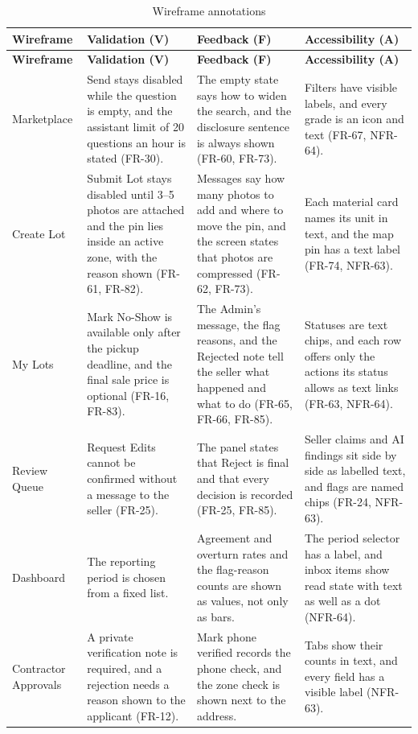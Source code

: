 {\footnotesize
\begin{longtable}{@{}p{}p{}p{}p{}@{}}
\caption{Wireframe annotations}\label{tab:wireframe-annotations}\\
\toprule
\textbf{Wireframe} & \textbf{Validation (V)} & \textbf{Feedback (F)} & \textbf{Accessibility (A)} \\
\midrule
\endfirsthead
\toprule
\textbf{Wireframe} & \textbf{Validation (V)} & \textbf{Feedback (F)} & \textbf{Accessibility (A)} \\
\midrule
\endhead
Marketplace & Send stays disabled while the question is empty, and the assistant limit of 20 questions an hour is stated (FR-30). & The empty state says how to widen the search, and the disclosure sentence is always shown (FR-60, FR-73). & Filters have visible labels, and every grade is an icon and text (FR-67, NFR-64). \\
Create Lot & Submit Lot stays disabled until 3--5 photos are attached and the pin lies inside an active zone, with the reason shown (FR-61, FR-82). & Messages say how many photos to add and where to move the pin, and the screen states that photos are compressed (FR-62, FR-73). & Each material card names its unit in text, and the map pin has a text label (FR-74, NFR-63). \\
My Lots & Mark No-Show is available only after the pickup deadline, and the final sale price is optional (FR-16, FR-83). & The Admin's message, the flag reasons, and the Rejected note tell the seller what happened and what to do (FR-65, FR-66, FR-85). & Statuses are text chips, and each row offers only the actions its status allows as text links (FR-63, NFR-64). \\
Review Queue & Request Edits cannot be confirmed without a message to the seller (FR-25). & The panel states that Reject is final and that every decision is recorded (FR-25, FR-85). & Seller claims and AI findings sit side by side as labelled text, and flags are named chips (FR-24, NFR-63). \\
Dashboard & The reporting period is chosen from a fixed list. & Agreement and overturn rates and the flag-reason counts are shown as values, not only as bars. & The period selector has a label, and inbox items show read state with text as well as a dot (NFR-64). \\
Contractor Approvals & A private verification note is required, and a rejection needs a reason shown to the applicant (FR-12). & Mark phone verified records the phone check, and the zone check is shown next to the address. & Tabs show their counts in text, and every field has a visible label (NFR-63). \\
\bottomrule
\end{longtable}
}

